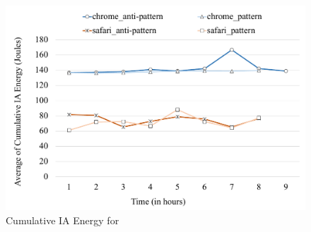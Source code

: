  \begin{figure}[ht]
	\includegraphics[width=\linewidth]{RQ3/Img/rq3-DRR-cumulative-IA-eng.pdf}
	\caption{Cumulative IA Energy for \drr}
	\label{fig:rq3-DRR-cumulative-IA-eng}	
\end{figure}